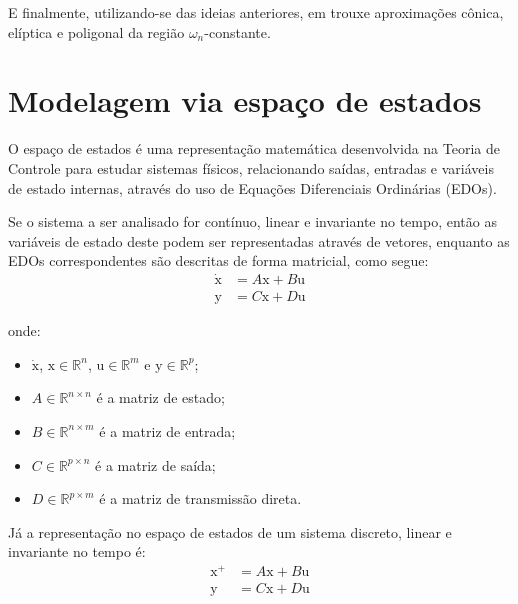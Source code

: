 E finalmente, utilizando-se das ideias anteriores,  em  trouxe aproximações cônica, elíptica e poligonal da região $\omega_n$-constante.

\section{Modelagem via espaço de estados}
O espaço de estados é uma representação matemática desenvolvida na Teoria de Controle para estudar sistemas físicos, relacionando saídas, entradas e variáveis de estado internas, através do uso de Equações Diferenciais Ordinárias (EDOs).

Se o sistema a ser analisado for contínuo, linear e invariante no tempo, então as variáveis de estado deste podem ser representadas através de vetores, enquanto as EDOs correspondentes são descritas de forma matricial, como segue:
\begin{subequations}
\label{eq:SSC}
\begin{align}
\dot{\pmb{\mathrm{x}}} &= A\pmb{\mathrm{x}} + B\pmb{\mathrm{u}}\label{eq:SSCEntrada}\\
\pmb{\mathrm{y}} &= C\pmb{\mathrm{x}} + D\pmb{\mathrm{u}}\label{eq:SSCSaida}
\end{align}
\end{subequations}

\noindent onde:

\begin{itemize}
\item $\dot{\pmb{\mathrm{x}}}$, $\pmb{\mathrm{x}} \in \mathbb{R}^n$, $\pmb{\mathrm{u}} \in \mathbb{R}^m$ e $\pmb{\mathrm{y}} \in \mathbb{R}^p$;
\item $A \in \mathbb{R}^{n \times n}$ é a matriz de estado;
\item $B \in \mathbb{R}^{n \times m}$ é a matriz de entrada;
\item $C \in \mathbb{R}^{p \times n}$ é a matriz de saída;
\item $D \in \mathbb{R}^{p \times m}$ é a matriz de transmissão direta.
\end{itemize}

Já a representação no espaço de estados de um sistema discreto, linear e invariante no tempo é:
\begin{subequations}
\label{eq:SSD}
\begin{align}
\pmb{\mathrm{x^+}} &= A\pmb{\mathrm{x}} + B\pmb{\mathrm{u}}\label{eq:SSDEntrada}\\
\pmb{\mathrm{y}} &= C\pmb{\mathrm{x}} + D\pmb{\mathrm{u}}\label{eq:SSDSaida}
\end{align}
\end{subequations}


